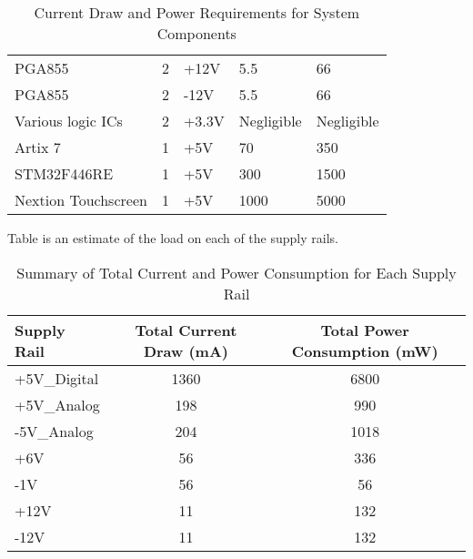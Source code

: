 \begin{table}[ht]
\begin{tabular}{@{}lcp{1.5cm}p{1.8cm}p{2cm}@{}}
            PGA855                   & 2               & +12V                 & 5.5                        & 66                              \\
            PGA855                   & 2               & -12V                 & 5.5                        & 66                              \\
            Various logic ICs        & 2               & +3.3V                 & Negligible                & Negligible                              \\
            Artix 7                  & 1               & +5V                   & 70                         & 350                               \\
            STM32F446RE                    & 1               & +5V                  & 300                        & 1500                             \\
            Nextion Touchscreen       & 1               & +5V                  & 1000                       & 5000                             \\ \bottomrule
            \end{tabular}
            \caption{Current Draw and Power Requirements for System Components}
            \label{tab:A_current_draw_power}
            \end{table}
Table  is an estimate of the load on each of the supply rails.
            \begin{table}[ht]
                \centering
                \begin{tabular}{@{}lcc@{}}
                \toprule
                \textbf{Supply Rail} & \textbf{Total Current Draw (mA)} & \textbf{Total Power Consumption (mW)} \\ \midrule
                +5V\_Digital          &        1360                                & 6800                                      \\  
                +5V\_Analog                  & 198                            & 990                                  \\
                -5V\_Analog                  & 204                             & 1018                                  \\
                +6V                  & 56                             & 336                                  \\
                -1V                  & 56                             & 56                                   \\
                +12V                 & 11                              & 132                                   \\
                -12V                 & 11                              & 132                                   \\ \bottomrule
                \end{tabular}
                \caption{Summary of Total Current and Power Consumption for Each Supply Rail}
                \label{tab:total_power_current}
                \end{table}
                
